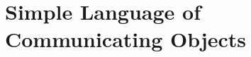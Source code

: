 \chapter[Simple Language of Communicating Objects]{Simple Language of Communicating Objects}
\label{chap:SLCO}















 

